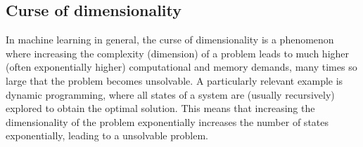 \subsection{Curse of dimensionality}
In machine learning in general, the curse of dimensionality is a phenomenon where increasing the complexity (dimension) of a problem leads to much higher (often exponentially higher) computational and memory demands, many times so large that the problem becomes unsolvable. A particularly relevant example is dynamic programming, where all states of a system are (usually recursively) explored to obtain the optimal solution. This means that increasing the dimensionality of the problem exponentially increases the number of states exponentially, leading to a unsolvable problem.

